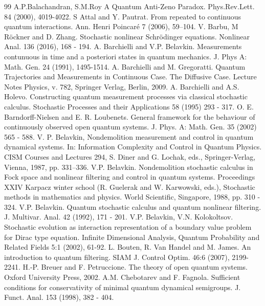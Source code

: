 \documentclass[10pt,a4paper]{amsart}
\begin{document}
\begin{thebibliography}{99}
 A.P.Balachandran, S.M.Roy A Quantum Anti-Zeno Paradox. Phys.Rev.Lett. 84 (2000), 4019-4022.
 S Attal and Y. Pautrat. From repeated to continuous quantum interactions. Ann. Henri Poincar\'e 7 (2006), 59--104.
 V. Barbu, M R\"ockner and D. Zhang. Stochastic nonlinear Schrödinger equations. Nonlinear Anal. 136 (2016), 168 - 194.
 A. Barchielli and V.P. Belavkin. Measurements contunuous in time and a posteriori states in quantum mechanics. J. Phys A: Math. Gen. 24 (1991), 1495-1514.
 A. Barchielli and M. Gregoratti. Quantum Trajectories and Measurements in Continuous Case. The Diffusive Case. Lecture Notes Physics, v. 782, Springer Verlag, Berlin, 2009.
 A. Barchielli and A.S. Holevo. Constructing quantum measurement processes via classical stochastic calculus. Stochastic Processes and their Applications 58 (1995) 293 - 317.
 O. E. Barndorff-Nielsen and E. R. Loubenets. General framework for the behaviour of continuously observed open quantum systems. J. Phys. A: Math. Gen. 35 (2002) 565 - 588.
 V. P. Belavkin, Nondemolition measurement and control in quantum dynamical systems. In: Information Complexity and Control in Quantum Physics. CISM Courses and Lectures 294, S. Diner and G. Lochak, eds., Springer-Verlag, Vienna, 1987, pp. 331–336.
 V.P. Belavkin. Nondemolition stochastic calculus in Fock space and nonlinear filtering and control in quantum systems. Proceedings XXIV Karpacz winter school (R. Guelerak and W. Karwowski, eds.), Stochastic methods in mathematics and physics. World Scientific, Singapore, 1988, pp. 310 - 324.
 V.P. Belavkin. Quantum stochastic calculus and quantum nonlinear filtering. J. Multivar. Anal. 42 (1992), 171 - 201.
 V.P. Belavkin, V.N. Kolokoltsov. Stochastic evolution as interaction representation of a boundary value problem for Dirac type equation. Infinite Dimensional Analysis, Quantum Probability and Related Fields 5:1 (2002), 61-92.
 L. Bouten, R. Van Handel and M. James. An introduction to quantum filtering. SIAM J. Control Optim. 46:6 (2007), 2199-2241.
 H.-P. Breuer and F. Petruccione. The theory of open quantum systems. Oxford University Press, 2002.
 A.M. Chebotarev and F. Fagnola. Sufficient conditions for conservativity of minimal quantum dynamical semigroups. J. Funct. Anal. 153 (1998), 382 - 404.

\end{thebibliography}
\end{document}
